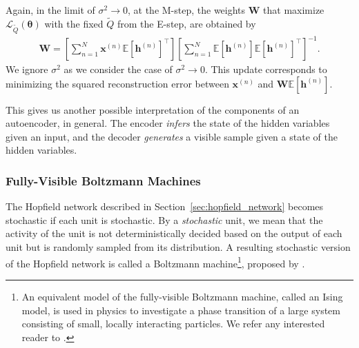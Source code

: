\documentclass{now}
\newcommand{\vect}[1]{\mathbf{#1}}
\newcommand{\vects}[1]{\boldsymbol{#1}}
\newcommand{\matr}[1]{\mathbf{#1}}
\newcommand{\vh}[0]{\vect{h}}
\newcommand{\vx}[0]{\vect{x}}
\newcommand{\mW}[0]{\matr{W}}
\newcommand{\TT}[0]{{\vects{\theta}}}
\newcommand{\LL}[0]{\mathcal{L}}
\newcommand{\E}[0]{\mathbb{E}}
\begin{document}
Again, in the limit of $\sigma^2 \to 0$, at the M-step, the weights $\mW$ that
maximize $\LL_{\tilde{Q}}(\TT)$ with the fixed $\tilde{Q}$ from the E-step, are
obtained by
\begin{align}
    \label{eq:ppca_m_weights}
    \mW = \left[ \sum_{n=1}^N \vx^{(n)} \E\left[ \vh^{(n)}
    \right]^\top \right]\left[ \sum_{n=1}^N \E\left[
    \vh^{(n)} \right] \E\left[ \vh^{(n)} \right]^\top
    \right]^{-1}.
\end{align}
We ignore $\sigma^2$ as we consider the case of $\sigma^2 \to 0$.  This update
corresponds to minimizing the squared reconstruction error between $\vx^{(n)}$
and $\mW \E\left[\vh^{(n)}\right]$.


This gives us another possible interpretation of the components of an
autoencoder, in general. The encoder \textit{infers} the state of the hidden
variables given an input, and the decoder \textit{generates} a visible sample
given a state of the hidden variables.

\subsubsection{Fully-Visible Boltzmann Machines}
\label{sec:fvbm}

The Hopfield network described in Section~\ref{sec:hopfield_network} becomes
stochastic if each unit is stochastic.  By a \textit{stochastic} unit, we mean
that the activity of the unit is not deterministically decided based on the
output of each unit but is randomly sampled from its distribution.  A resulting
stochastic version of the Hopfield network is called a Boltzmann
machine\footnote{ 
    An equivalent model of the fully-visible Boltzmann machine, called an Ising
    model, is used in physics to investigate a phase transition of a large
    system consisting of small, locally interacting particles. We refer any
    interested reader to \citep[][and references therein]{Cipra1987}.
}, proposed by \citet{Ackley1985}. 
\end{document}
